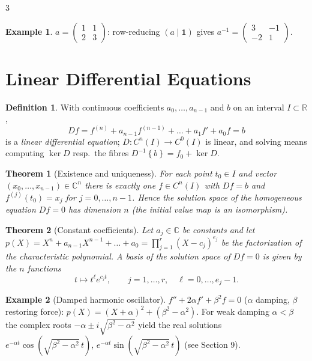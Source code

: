 \documentclass[10pt,a4paper,landscape]{article}
\theoremstyle{definition}
\newtheorem{defn}{Definition}[section]
\newtheorem{exm}{Example}[section]
\theoremstyle{plain}
\newtheorem{thm}{Theorem}[section]
\theoremstyle{remark}
\newcommand{\R}{\mathbb{R}}
\newcommand{\C}{\mathbb{C}}
\newcommand{\set}[1]{\left\{ #1 \right\}}
\newcommand{\one}{\mathbf{1}}
\begin{document}
\begin{multicols*}{3}
\begin{exm}
$a = \left(\begin{smallmatrix} 1 & 1 \\ 2 & 3 \end{smallmatrix}\right)$: row-reducing $(a \mid \one)$ gives $a^{-1} = \left(\begin{smallmatrix} 3 & -1 \\ -2 & 1 \end{smallmatrix}\right)$.
\end{exm}

\section{Linear Differential Equations}

\begin{defn}
With continuous coefficients $a_0, \dots, a_{n-1}$ and $b$ on an interval $I \subset \R$,
\[
Df = f^{(n)} + a_{n-1} f^{(n-1)} + \dots + a_1 f' + a_0 f = b
\]
is a \emph{linear differential equation}; $D: C^n(I) \to C^0(I)$ is linear, and solving means computing $\ker D$ resp.\ the fibres $D^{-1}\set{b} = f_0 + \ker D$.
\end{defn}

\begin{thm}[Existence and uniqueness]
For each point $t_0 \in I$ and vector $(x_0, \dots, x_{n-1}) \in \C^n$ there is exactly one $f \in C^n(I)$ with $Df = b$ and $f^{(j)}(t_0) = x_j$ for $j = 0, \dots, n-1$. Hence the solution space of the homogeneous equation $Df = 0$ has dimension $n$ (the initial value map is an isomorphism).
\end{thm}

\begin{thm}[Constant coefficients]
Let $a_j \in \C$ be constants and let $p(X) = X^n + a_{n-1}X^{n-1} + \dots + a_0 = \prod_{j=1}^r (X - c_j)^{e_j}$ be the factorization of the \emph{characteristic polynomial}. A basis of the solution space of $Df = 0$ is given by the $n$ functions
\[
t \mapsto t^{\ell} e^{c_j t}, \qquad j = 1, \dots, r, \quad \ell = 0, \dots, e_j - 1 .
\]
\end{thm}

\begin{exm}[Damped harmonic oscillator]
$f'' + 2\alpha f' + \beta^2 f = 0$ ($\alpha$ damping, $\beta$ restoring force): $p(X) = (X + \alpha)^2 + (\beta^2 - \alpha^2)$. For weak damping $\alpha < \beta$ the complex roots $-\alpha \pm i\sqrt{\beta^2 - \alpha^2}$ yield the real solutions $e^{-\alpha t}\cos(\sqrt{\beta^2 - \alpha^2}\, t)$, $e^{-\alpha t}\sin(\sqrt{\beta^2 - \alpha^2}\, t)$ (see Section 9).
\end{exm}


\end{multicols*}
\end{document}
